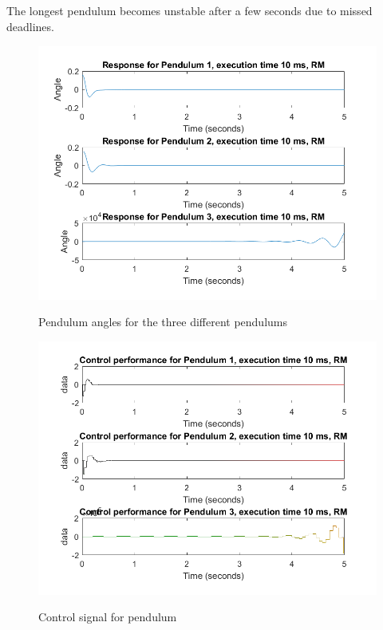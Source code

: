 \documentclass[12pt,a4paper]{article}
\begin{document}
\subsection{} %
The longest pendulum becomes unstable after a few seconds due to missed deadlines.
\begin{center}
      \begin{figure}[H]
      \centering
        \includegraphics[scale=0.5]{ex531.png}
        \label{fig:ex31}
        \caption{Pendulum angles for the three different pendulums}
      \end{figure}
    \end{center}
    
    \begin{center}
      \begin{figure}[H]
      \centering
        \includegraphics[scale=0.5]{ex532.png}
        \label{fig:ex32}
      \caption{Control signal for pendulum}
      \end{figure}
    \end{center}
    
\end{document}
